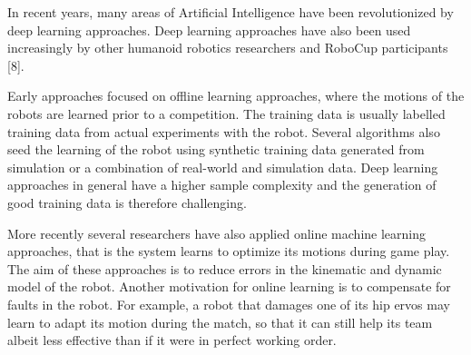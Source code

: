 \documentclass{article}
\begin{document}

In recent years, many areas of Artificial Intelligence have been revolutionized by deep learning approaches.
Deep learning approaches have also been used increasingly by other humanoid robotics researchers and RoboCup participants [8].


Early approaches focused on offline learning approaches, where the motions of the robots are learned prior to a competition.
The training data is usually labelled training data from actual experiments with the robot.
Several algorithms also seed the learning of the robot using synthetic training data generated from simulation or a combination of real-world and simulation data.
Deep learning approaches in general have a higher sample complexity and the generation of good training data is therefore challenging.

More recently several researchers have also applied online machine learning approaches, that is the system learns to optimize its motions during game play.
The aim of these approaches is to reduce errors in the kinematic and dynamic model of the robot.
Another motivation for online learning is to compensate for faults in the robot. For example, a robot that damages one of its hip ervos may learn to adapt its motion during the match, so that it can still help its team albeit less effective than if it were in perfect working order.
\end{document}
